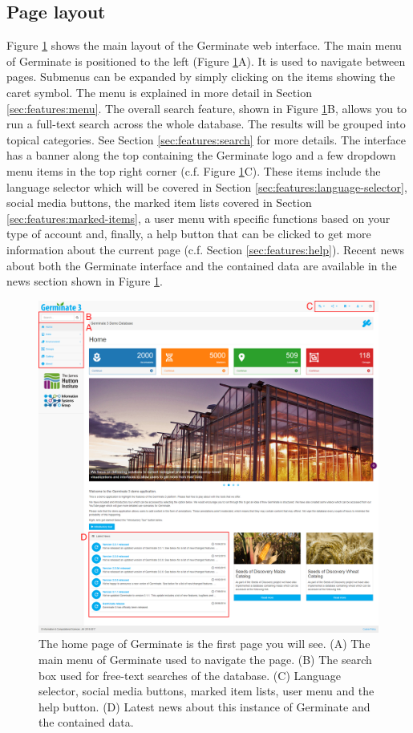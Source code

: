\subsection{Page layout}
Figure \ref{fig:overview:home} shows the main layout of the Germinate web interface. The main menu of Germinate is positioned to the left (Figure \ref{fig:overview:home}A). It is used to navigate between pages. Submenus can be expanded by simply clicking on the items showing the caret symbol. The menu is explained in more detail in Section \ref{sec:features:menu}. The overall search feature, shown in Figure \ref{fig:overview:home}B, allows you to run a full-text search across the whole database. The results will be grouped into topical categories. See Section \ref{sec:features:search} for more details. The interface has a banner along the top containing the Germinate logo and a few dropdown menu items in the top right corner (c.f. Figure \ref{fig:overview:home}C). These items include the language selector which will be covered in Section \ref{sec:features:language-selector}, social media buttons, the marked item lists covered in Section \ref{sec:features:marked-items}, a user menu with specific functions based on your type of account and, finally, a help button that can be clicked to get more information about the current page (c.f. Section \ref{sec:features:help}). Recent news about both the Germinate interface and the contained data are available in the news section shown in Figure \ref{fig:overview:home}.

\begin{figure}
	\centering
	\includegraphics[width=0.85\linewidth]{img/overview/home.png}
	\caption{The home page of Germinate is the first page you will see. (A) The main menu of Germinate used to navigate the page. (B) The search box used for free-text searches of the database. (C) Language selector, social media buttons, marked item lists, user menu and the help button. (D) Latest news about this instance of Germinate and the contained data.}
	\label{fig:overview:home}
\end{figure}